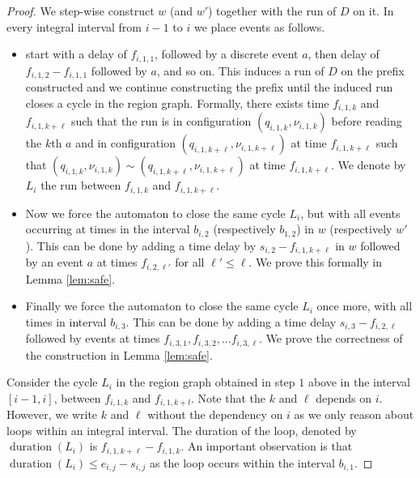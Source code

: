 \documentclass[10pt,a4paper]{amsart}
\theoremstyle{definition}
\numberwithin{equation}{section}
\newcommand{\dur}[1]{\mathop{duration}(#1)}
\newcommand{\req}{\sim}
\newcommand{\block}[2]{b_{#1,#2}}
\newcommand{\bstart}[2]{s_{#1,#2}}
\newcommand{\bend}[2]{e_{#1,#2}}
\newcommand{\tick}[3]{f_{#1,#2,#3}}
\newcommand{\confstate}[3]{q_{#1,#2,#3}}
\newcommand{\confval}[3]{\nu_{#1,#2,#3}}
\begin{document}
\begin{proof}
We step-wise construct $w$ (and $w'$) together with the run of $D$ on it.
In every integral interval from $i-1$ to $i$ we place events as follows.

\begin{itemize}
    \item start with a delay of $\tick{i}{1}{1}$,
    followed by a discrete event $a$, then delay of  $\tick{i}{1}{2}-\tick{i}{1}{1}$ followed by $a$,
    and so on. This induces a run of $D$ on the prefix constructed and we continue constructing the prefix until the induced run closes a cycle in the region graph. Formally, there exists time $\tick{i}{1}{k}$ 
    and $\tick{i}{1}{k+\ell}$ such that the run is in configuration 
    $(\confstate{i}{1}{k}, \confval{i}{1}{k})$ before reading the $k$th $a$ and in configuration $(\confstate{i}{1}{k+\ell}, \confval{i}{1}{k+\ell})$ at time $\tick{i}{1}{k+\ell}$ such that 
    $(\confstate{i}{1}{k}, \confval{i}{1}{k}) \req (\confstate{i}{1}{k+\ell}, \confval{i}{1}{k+\ell})$ at time $\tick{i}{1}{k+\ell}$.
    We denote by $L_i$ the run between $\tick{i}{1}{k}$ and $\tick{i}{1}{k+\ell}$. 
    
    \item Now we force  the automaton to close the same cycle $L_i$, but with all events occurring at times in the interval $\block{i}{2}$ (respectively $\block{1}{2}$) in $w$ (respectively $w'$).
    This can be done by adding a time delay by $\bstart{i}{2}-\tick{i}{1}{k+\ell}$ 
    in $w$ followed by an event $a$ at times $\tick{i}{2}{\ell'}$ for all $\ell'\leq \ell$. 
    We prove this formally in Lemma \ref{lem:safe}.
        
    
    \item Finally we force the automaton to close the same cycle $L_i$ once more, with all times
        in interval $\block{i}{3}$.
        This can be done by adding a time delay $\bstart{i}{3}-\tick{i}{2}{\ell}$ followed by events at times
        $\tick{i}{3}{1},
        \tick{i}{3}{2},\ldots
        \tick{i}{3}{\ell}
        $.
      We prove the correctness of the construction in Lemma \ref{lem:safe}.
  
\end{itemize}

Consider the cycle $L_i$ in the region graph obtained in step $1$ above in the interval $[i-1,i]$, between $\tick{i}{1}{k}$ and $\tick{i}{1}{k+l}$. Note that the $k$ and $\ell$ depends on $i$. However, we write $k$ and $\ell$ 
without
the dependency on $i$ 
as we only reason about loops within an integral interval.
The duration of the loop, denoted by $\dur{L_i}$ is $\tick{i}{1}{k+\ell}-\tick{i}{1}{k}$.
An important observation is that $\dur{L_i}\leq \bend{i}{j}-\bstart{i}{j}$ as the loop occurs within the interval $\block{i}{1}$. 
  

\end{proof}
\end{document}
